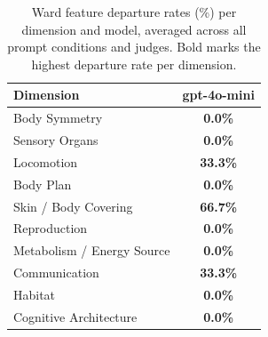 \begin{table}[htbp]
  \centering
  \caption{Ward feature departure rates (\%) per dimension and model, averaged across all prompt conditions and judges. Bold marks the highest departure rate per dimension.}
  \small
  \label{tab:ward_dimensions}
  \begin{tabular}{lc}
    \toprule
    Dimension & gpt-4o-mini \\
    \midrule
    Body Symmetry & \textbf{0.0\%} \\
    Sensory Organs & \textbf{0.0\%} \\
    Locomotion & \textbf{33.3\%} \\
    Body Plan & \textbf{0.0\%} \\
    Skin / Body Covering & \textbf{66.7\%} \\
    Reproduction & \textbf{0.0\%} \\
    Metabolism / Energy Source & \textbf{0.0\%} \\
    Communication & \textbf{33.3\%} \\
    Habitat & \textbf{0.0\%} \\
    Cognitive Architecture & \textbf{0.0\%} \\
    \bottomrule
  \end{tabular}
\end{table}
